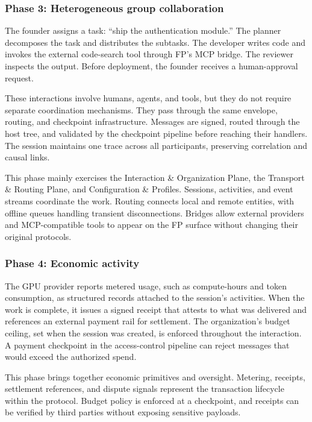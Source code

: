 \documentclass{llmxive}
\begin{document}
\subsubsection{Phase 3: Heterogeneous group collaboration}

The founder assigns a task: ``ship the authentication module.'' The planner decomposes the task and distributes the subtasks. The developer writes code and invokes the external code-search tool through FP's MCP bridge. The reviewer inspects the output. Before deployment, the founder receives a human-approval request.

These interactions involve humans, agents, and tools, but they do not require separate coordination mechanisms. They pass through the same envelope, routing, and checkpoint infrastructure. Messages are signed, routed through the host tree, and validated by the checkpoint pipeline before reaching their handlers. The session maintains one trace across all participants, preserving correlation and causal links.

This phase mainly exercises the Interaction \& Organization Plane, the Transport \& Routing Plane, and Configuration \& Profiles. Sessions, activities, and event streams coordinate the work. Routing connects local and remote entities, with offline queues handling transient disconnections. Bridges allow external providers and MCP-compatible tools to appear on the FP surface without changing their original protocols.

\subsubsection{Phase 4: Economic activity}

The GPU provider reports metered usage, such as compute-hours and token consumption, as structured records attached to the session's activities. When the work is complete, it issues a signed receipt that attests to what was delivered and references an external payment rail for settlement. The organization's budget ceiling, set when the session was created, is enforced throughout the interaction. A payment checkpoint in the access-control pipeline can reject messages that would exceed the authorized spend.

This phase brings together economic primitives and oversight. Metering, receipts, settlement references, and dispute signals represent the transaction lifecycle within the protocol. Budget policy is enforced at a checkpoint, and receipts can be verified by third parties without exposing sensitive payloads.
\end{document}
